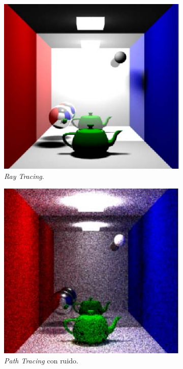 \documentclass[titlepage,12pt]{article}
\begin{document}
\begin{figure}[H]
	\centering
	\begin{subfigure}{.3\textwidth}
		\centering
		\includegraphics[width=.8\textwidth]{media/RayTracing.png}
		\caption{\textit{Ray Tracing}.}
		\label{RT}
	\end{subfigure}
	\begin{subfigure}{.3\textwidth}
		\centering
		\includegraphics[width=.8\textwidth]{media/PathTracing.png}
		\caption{\textit{Path Tracing} con ruido.}
		\label{PTN}
	\end{subfigure}
	\begin{subfigure}{.3\textwidth}
		\centering

\end{subfigure}
\end{figure}
\end{document}
